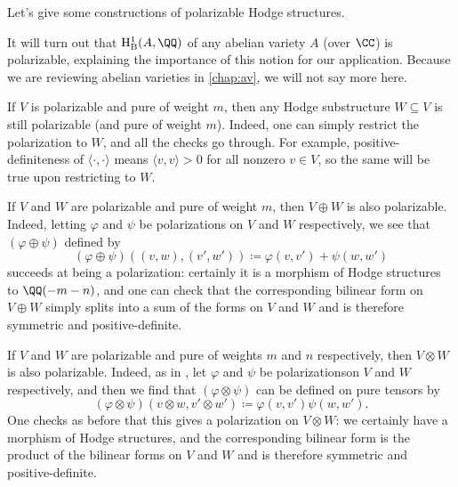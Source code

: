 \documentclass[../thesis.tex]{subfiles}
\begin{document}
Let's give some constructions of polarizable Hodge structures.
\begin{example} \label{ex:av-polarizable-hs}
	It will turn out that $\mathrm H^1_{\mathrm B}(A,\QQ)$ of any abelian variety $A$ (over $\CC$) is polarizable, explaining the importance of this notion for our application. Because we are reviewing abelian varieties in \cref{chap:av}, we will not say more here.
\end{example}
\begin{example} \label{ex:polarize-subspace}
	If $V$ is polarizable and pure of weight $m$, then any Hodge substructure $W\subseteq V$ is still polarizable (and pure of weight $m$). Indeed, one can simply restrict the polarization to $W$, and all the checks go through. For example, positive-definiteness of $\langle\cdot,\cdot\rangle$ means $\langle v,v\rangle>0$ for all nonzero $v\in V$, so the same will be true upon restricting to $W$.
\end{example}
\begin{example} \label{ex:polarize-sum}
	If $V$ and $W$ are polarizable and pure of weight $m$, then $V\oplus W$ is also polarizable. Indeed, letting $\varphi$ and $\psi$ be polarizations on $V$ and $W$ respectively, we see that $(\varphi\oplus\psi)$ defined by
	\[(\varphi\oplus\psi)((v,w),(v',w'))\coloneqq\varphi(v,v')+\psi(w,w')\]
	succeeds at being a polarization: certainly it is a morphism of Hodge structures to $\QQ(-m-n)$, and one can check that the corresponding bilinear form on $V\oplus W$ simply splits into a sum of the forms on $V$ and $W$ and is therefore symmetric and positive-definite.
\end{example}
\begin{example}
	If $V$ and $W$ are polarizable and pure of weights $m$ and $n$ respectively, then $V\otimes W$ is also polarizable. Indeed, as in , let $\varphi$ and $\psi$ be polarizationson $V$ and $W$ respectively, and then we find that $(\varphi\otimes\psi)$ can be defined on pure tensors by
	\[(\varphi\otimes\psi)(v\otimes w,v'\otimes w')\coloneqq\varphi(v,v')\psi(w,w').\]
	One checks as before that this gives a polarization on $V\otimes W$: we certainly have a morphism of Hodge structures, and the corresponding bilinear form is the product of the bilinear forms on $V$ and $W$ and is therefore symmetric and positive-definite.
\end{example}
\end{document}
